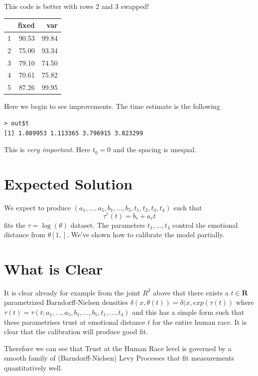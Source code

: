\documentclass{amsart}
\begin{document}
This code is better with rows 2 and 3 swapped!

\begin{table}[ht]
\centering
\begin{tabular}{rrr}
  \hline
 & fixed & var \\ 
  \hline
1 & 90.53 & 99.84 \\ 
  2 & 75.00 & 93.34 \\ 
  3 & 79.10 & 74.50 \\ 
  4 & 70.61 & 75.82 \\ 
  5 & 87.26 & 99.95 \\ 
   \hline
\end{tabular}
\end{table}

Here we begin to see improvements.  The time estimate is the following
\begin{verbatim}
> out$t
[1] 1.089953 1.113365 3.796915 3.823299
\end{verbatim}
This is {\em very important}.  Here $t_0=0$ and the spacing is unequal.



\section{Expected Solution}

We expect to produce $(a_1,\dots,a_5,b_1,\dots,b_5,t_1,t_2,t_3,t_4)$ such that 
\[
\tau^r(t) = b_r + a_r t
\]
fits the $\tau = \log(\theta)$ dataset.  The parameters $t_1,\dots, t_4$ control the emotional distance from $\theta[1,]$.  We've shown how to calibrate the model partially.

\section{What is Clear}
It is clear already for example from the joint $R^2$ above that there exists a $t\in \mathbf{R}$ parametrized Barndorff-Nielsen densities $\delta(x, \theta(t)) = \delta( x,exp(\tau(t))$ where $\tau(t) = \tau(t; a_1, \dots, a_5, b_1, \dots, b_5, t_1,\dots, t_4)$ and this has a simple form such that these parametrises trust at emotional distance $t$ for the entire human race.  It is clear that the calibration will produce good fit. 

Therefore we can see that Trust at the Human Race level is governed by a smooth family of (Barndorff-Nielsen) Levy Processes that fit measurements quantitatively well.
\end{document}
